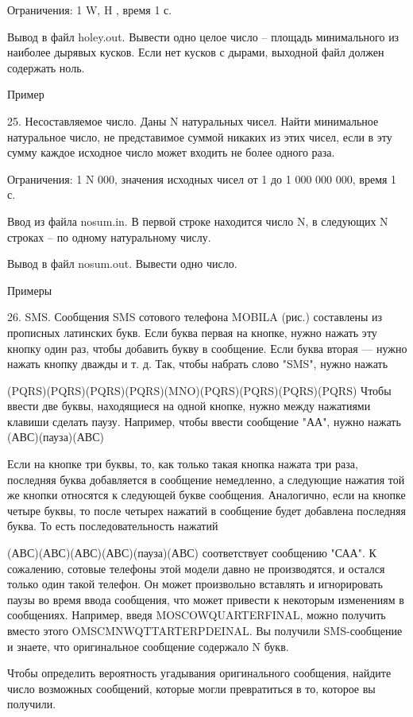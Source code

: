 \documentclass[]{article}
\begin{document}
\begin{enumerate}
Ограничения: 1 \leq W, H , время 1 с.

Вывод в файл holey.out. Вывести одно целое число – площадь минимального из наиболее дырявых кусков. Если нет кусков с дырами, выходной файл должен содержать ноль.

Пример



25. Несоставляемое число. Даны N натуральных чисел. Найти минимальное натуральное число, не представимое суммой никаких из этих чисел, если в эту сумму каждое исходное число может входить не более одного раза.

Ограничения: 1 \leq N  000, значения исходных чисел от 1 до 1 000 000 000, время 1 с.

Ввод из файла nosum.in. В первой строке находится число N, в следующих N строках – по одному натуральному числу.

Вывод в файл nosum.out. Вывести одно число.

Примеры



26. SMS. Сообщения SMS сотового телефона MOBILA (рис.) составлены из прописных латинских букв. Если буква первая на кнопке, нужно нажать эту кнопку один раз, чтобы добавить букву в сообщение. Если буква вторая — нужно нажать кнопку дважды и т. д. Так, чтобы набрать слово "SMS", нужно нажать

(PQRS)(PQRS)(PQRS)(PQRS)(MNO)(PQRS)(PQRS)(PQRS)(PQRS)
Чтобы ввести две буквы, находящиеся на одной кнопке, нужно между нажатиями клавиши сделать паузу. Например, чтобы ввести сообщение "АА", нужно нажать (АВС)(пауза)(АВС)

Если на кнопке три буквы, то, как только такая кнопка нажата три раза, последняя буква добавляется в сообщение немедленно, а следующие нажатия той же кнопки относятся к следующей букве сообщения. Аналогично, если на кнопке четыре буквы, то после четырех нажатий в сообщение будет добавлена последняя буква. То есть последовательность нажатий

(АВС)(АВС)(АВС)(АВС)(пауза)(АВС)
соответствует сообщению "САА". К сожалению, сотовые телефоны этой модели давно не производятся, и остался только один такой телефон. Он может произвольно вставлять и игнорировать паузы во время ввода сообщения, что может привести к некоторым изменениям в сообщениях. Например, введя MOSCOWQUARTERFINAL, можно получить вместо этого OMSCMNWQTTARTERPDEINAL. Вы получили SMS-сообщение и знаете, что оригинальное сообщение содержало N букв.

Чтобы определить вероятность угадывания оригинального сообщения, найдите число возможных сообщений, которые могли превратиться в то, которое вы получили.




\end{enumerate}
\end{document}

